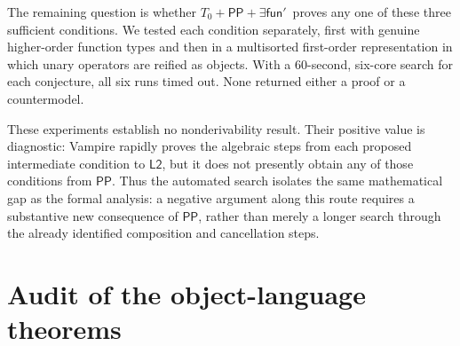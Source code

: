 \documentclass[12pt,leqno]{article}
\theoremstyle{plain}
\theoremstyle{definition}
\newcommand{\funp}{\ensuremath{\mathsf{fun}'\,}}
\newcommand{\PP}{\ensuremath{\mathsf{PP}}}
\newcommand{\Ltwo}{\ensuremath{\mathsf{L2}}}
\begin{document}
\noindent
The remaining question is whether \(T_0+\PP+\exists\funp\) proves any one of
these three sufficient conditions.  We tested each condition separately,
first with genuine higher-order function types and then in a multisorted
first-order representation in which unary operators are reified as objects.
With a 60-second, six-core search for each conjecture, all six runs timed out.
None returned either a proof or a countermodel.

These experiments establish no nonderivability result.  Their positive value
is diagnostic: Vampire rapidly proves the algebraic steps from each proposed
intermediate condition to \Ltwo, but it does not presently obtain any of
those conditions from \PP.  Thus the automated search isolates the same
mathematical gap as the formal analysis: a negative argument along this route
requires a substantive new consequence of \PP, rather than merely a longer
search through the already identified composition and cancellation steps.

\section{Audit of the object-language theorems}
\end{document}
